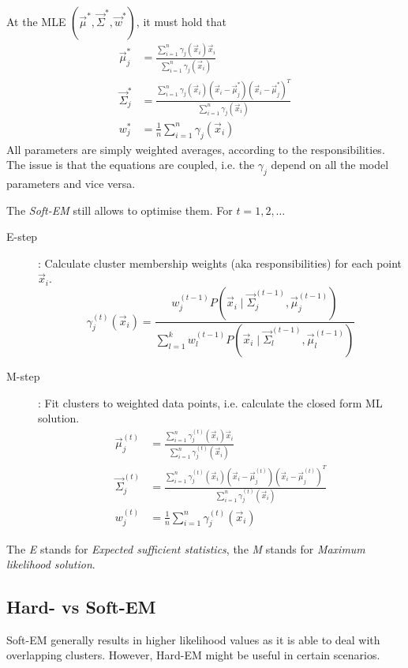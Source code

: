 At the MLE $(\vec{\mu}^*, \vec{\Sigma}^*, \vec{w}^*)$,
it must hold that
\begin{align*}
\vec{\mu}^*_j &= \frac{\sum_{i=1}^n{\gamma_j(\vec{x}_i) \vec{x}_i}}{\sum_{i=1}^n{\gamma_j(\vec{x}_i)}} \\
\vec{\Sigma}^*_j &= \frac{
	\sum_{i=1}^n{
		\gamma_j(\vec{x}_i) (\vec{x}_i - \vec{\mu}_j^*) (\vec{x}_i - \vec{\mu}_j^*)^T
	}
}{
	\sum_{i=1}^n{\gamma_j(\vec{x}_i)}
}
\\
w_j^* &= \frac{1}{n} \sum_{i=1}^n{\gamma_j(\vec{x}_i)}
\end{align*}
All parameters are simply weighted averages,
according to the responsibilities.
The issue is that the equations are coupled,
i.e. the $\gamma_j$ depend on
all the model parameters and vice versa.

The \emph{Soft-EM} still allows to optimise them.
For $t = 1, 2, \dotsc$
\begin{description}
	\item[E-step]: Calculate cluster membership weights
	(aka responsibilities)
	for each point $\vec{x}_i$.
	\begin{equation*}
	\gamma_j^{(t)}(\vec{x}_i) = \frac{
		w_j^{(t-1)} P(\vec{x}_i \mid \vec{\Sigma}_j^{(t-1)}, \vec{\mu}_j^{(t-1)})
	}{
		\sum_{l=1}^k{
			w_l^{(t-1)} P(\vec{x}_i \mid \vec{\Sigma}_l^{(t-1)}, \vec{\mu}_l^{(t-1)})
		}
	}
	\end{equation*}
	\item[M-step]: Fit clusters to weighted data points,
	i.e. calculate the closed form ML solution.
	\begin{align*}
	\vec{\mu}^{(t)}_j
	&= \frac{\sum_{i=1}^n{\gamma_j^{(t)}(\vec{x}_i) \vec{x}_i}}{\sum_{i=1}^n{\gamma_j^{(t)}(\vec{x}_i)}} \\
	\vec{\Sigma}^{(t)}_j &= \frac{
		\sum_{i=1}^n{
			\gamma_j^{(t)}(\vec{x}_i) (\vec{x}_i - \vec{\mu}_j^{(t)}) (\vec{x}_i - \vec{\mu}_j^{(t)})^T
		}
	}{
		\sum_{i=1}^n{\gamma_j^{(t)}(\vec{x}_i)}
	}
	\\
	w_j^{(t)} &= \frac{1}{n} \sum_{i=1}^n{\gamma_j^{(t)}(\vec{x}_i)}
	\end{align*}
\end{description}
The \emph{E} stands for \emph{Expected sufficient statistics},
the \emph{M} stands for \emph{Maximum likelihood solution}.


\subsection{Hard- vs Soft-EM}
Soft-EM generally results in higher likelihood values
as it is able to deal with overlapping clusters.
However, Hard-EM might be useful in certain scenarios.

